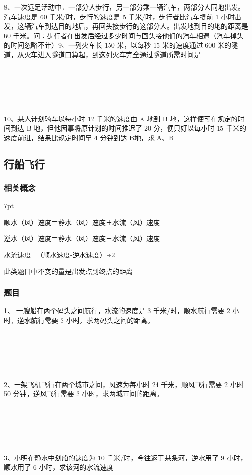 \documentclass{article}
\newenvironment{wa}{%
\def\FrameCommand{%
\hspace{1pt}%
{\color{LightCoral}\vrule width 2pt}%
{\color{washade}\vrule width 4pt}%
\colorbox{washade}%
}%
\MakeFramed{\advance\hsize-\width\FrameRestore}%
\noindent\hspace{-4.55pt}%
\begin{adjustwidth}{}{7pt}%
\vspace{2pt}\vspace{2pt}%
\normalfont %
}
{%
\vspace{2pt}\end{adjustwidth}\endMakeFramed%
}
\begin{document}
~\\
~\\
~\\
~\\
~\\
8、一次远足活动中，一部分人步行，另一部分乘一辆汽车，两部分人同地出发。汽车速度是 60 千米/时，步行的速度是 5 千米/时，步行者比汽车提前 1 小时出发，这辆汽车到达目的地后，再回头接步行的这部分人。出发地到目的地的距离是 60 千米。问：步行者在出发后经过多少时间与回头接他们的汽车相遇（汽车掉头的时间忽略不计）9、一列火车长 150 米，以每秒 15 米的速度通过 600 米的隧道，从火车进入隧道口算起，到这列火车完全通过隧道所需时间是

~\\
~\\
~\\
~\\
~\\
10、某人计划骑车以每小时 12 千米的速度由 A 地到 B 地，这样便可在规定的时间到达 B 地，但他因事将原计划的时间推迟了 20 分，便只好以每小时 15 千米的速度前进，结果比规定时间早 4 分钟到达 B地，求 A、B
\subsection{行船飞行}
\subsubsection*{相关概念}
\begin{wa}
\quad \quad 顺水（风）速度＝静水（风）速度＋水流（风）速度

逆水（风）速度＝静水（风）速度－水流（风）速度

水流速度=（顺水速度-逆水速度）÷2

此类题目中不变的量是出发点到终点的距离
\end{wa}
\subsubsection*{题目}
1、 一艘船在两个码头之间航行，水流的速度是 3 千米/时，顺水航行需要 2 小时，逆水航行需要 3 小时，求两码头之间的距离。

~\\
~\\
~\\
~\\
~\\
2、一架飞机飞行在两个城市之间，风速为每小时 24 千米，顺风飞行需要 2 小时 50 分钟，逆风飞行需要 3 小时，求两城市间的距离。

~\\
~\\
~\\
~\\
~\\
3、小明在静水中划船的速度为 10 千米/时，今往返于某条河，逆水用了 9 小时，顺水用了 6 小时，求该河的水流速度
\end{document}
